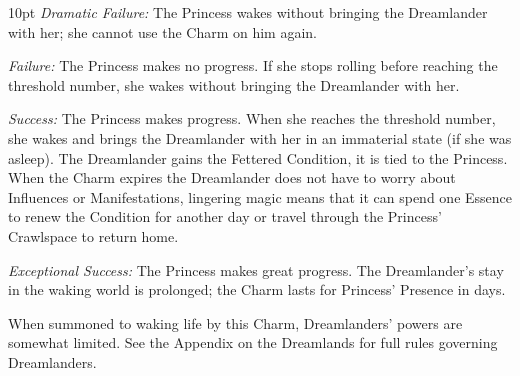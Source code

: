 \begin{myindentpar}{10pt}    \emph{Dramatic Failure:} The Princess wakes without bringing the Dreamlander with her; she cannot use the Charm on him again.

    \emph{Failure:} The Princess makes no progress. If she stops rolling before reaching the threshold number, she wakes without bringing the Dreamlander with her.

    \emph{Success:} The Princess makes progress. When she reaches the threshold number, she wakes and brings the Dreamlander with her in an immaterial state (if she was asleep). The Dreamlander gains the Fettered Condition, it is tied to the Princess. When the Charm expires the Dreamlander does not have to worry about Influences or Manifestations, lingering magic means that it can spend one Essence to renew the Condition for another day or travel through the Princess' Crawlspace to return home. 

    \emph{Exceptional Success:} The Princess makes great progress. The Dreamlander's stay in the waking world is prolonged; the Charm lasts for Princess' Presence in days.\end{myindentpar}

When summoned to waking life by this Charm, Dreamlanders' powers are somewhat limited. See the Appendix on the Dreamlands for full rules governing Dreamlanders. 

